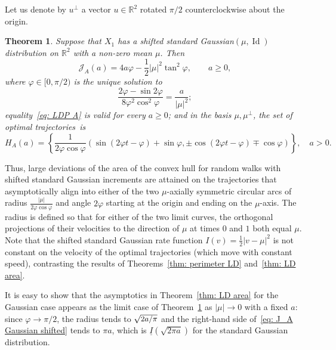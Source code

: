 \documentclass[10pt]{amsart}
\newtheorem{theo}{Theorem}[section]
\theoremstyle{definition}\newtheorem{defi}[theo]{Definition}\newtheorem{rema}[theo]{Remark}\newtheorem{exam}[theo]{Example}\newtheorem{exem}[theo]{Example}\newtheorem{nota}[theo]{Notation}
\DeclareMathOperator{\id}{Id}
\newcommand{\ubar}[1]{\underline{#1}}
\newcommand{\Rbb}{\mathbb{R}}
\newcommand{\Jcl}{\mathcal{J}}
\begin{document}
Let us denote by $u^\bot$ a vector $u \in \Rbb^2$ rotated $\pi/2$ counterclockwise about the origin.

\begin{theo}\label{thm: LD Gaussian area}
Suppose that $X_1$ has a shifted standard Gaussian$(\mu, \id)$ distribution on $\Rbb^2$ with a non-zero mean $\mu$. Then
\begin{equation}\label{eq: J_A Gaussian shifted}
\Jcl_A(a)=4 a \varphi - \frac12 |\mu|^2 \tan^2 \varphi, \qquad a \ge 0,
\end{equation}
where $\varphi \in [0, \pi/2)$ is the unique solution to
\[
\frac{2\varphi - \sin 2 \varphi}{8 \varphi^2 \cos^2 \varphi} = \frac{a}{|\mu|^2};
\]
equality~\eqref{eq: LDP A} is valid for every $a \ge 0$; and in the basis $\mu, \mu^\bot$, the set of optimal trajectories~is
\begin{equation}\label{eq: A shape shifted}
H_A(a)= \left\{ \frac{1}{2 \varphi \cos \varphi} \left(\sin(2 \varphi t - \varphi) + \sin \varphi, \pm \cos(2 \varphi t - \varphi) \mp \cos \varphi \right) \right\}, \quad a>0.
\end{equation}
\end{theo}

Thus, large deviations of the area of the convex hull for random walks with shifted standard Gaussian increments are attained on the trajectories that asymptotically align into either of the two $\mu$-axially symmetric circular arcs of radius $\frac{|\mu|}{2 \varphi \cos \varphi}$ and angle $2 \varphi$ starting at the origin and ending on the $\mu$-axis. The radius is defined so that for either of the two limit curves, the orthogonal projections of their velocities to the direction of $\mu$ at times $0$ and $1$ both equal $\mu$. Note that the shifted standard Gaussian rate function $I(v)=\frac12 |v-\mu|^2$ is not constant on the velocity of the optimal trajectories (which move with constant speed), contrasting the results of Theorems~\ref{thm: perimeter LD} and~\ref{thm: LD area}.


It is easy to show that the asymptotics in Theorem~\ref{thm: LD area} for the Gaussian case appears as the limit case of Theorem~\ref{thm: LD Gaussian area} as $|\mu| \to 0$ with a fixed $a$: since $\varphi \to \pi/2$, the radius tends to $\sqrt{\text{\small{$2a/\pi$}}}$ and the right-hand side of~\eqref{eq: J_A Gaussian shifted} tends to $\pi a$, which is $\ubar I (\sqrt{2 \pi a })$ for the standard Gaussian distribution.
\end{document}
